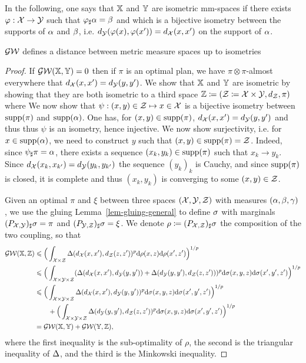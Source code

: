 In the following, one says that $\mathbb{X}$ and $\mathbb{Y}$ are isometric mm-spaces if there exists $\varphi : \mathcal{X} \rightarrow \mathcal{Y}$ such that $\varphi_{\sharp}\alpha=\beta$ and which is a bijective isometry between the supports of $\alpha$ and $\beta$, i.e. $d_{\mathcal{Y}}(\varphi(x),\varphi(x'))=d_{\mathcal{X}}(x,x')$ on the support of $\alpha$.
 

\begin{thm}
	$\operatorname{\mathcal{GW}}$ defines a distance between metric measure spaces up to isometries
\end{thm}
\begin{proof}
	If $\operatorname{\mathcal{GW}}( \mathbb{X},\mathbb{Y} )=0$ then if $\pi$ is an optimal plan, we have $\pi \otimes \pi$-almost everywhere that $d_{\mathcal{X}}(x,x')=d_{\mathcal{Y}}(y,y')$.
	We show that $\mathbb{X}$ and $\mathbb{Y}$ are isometric by showing that they are both isometric to a third space $\mathbb{Z} \coloneqq (\mathcal{Z} \coloneqq \mathcal{X} \times \mathcal{Y},d_{\mathcal{Z}},\pi)$
	where 
	We now show that $\psi : (x,y) \in \mathcal{Z} \mapsto x \in \mathcal{X}$ is a bijective isometry between $\operatorname{supp}(\pi)$ and $\operatorname{supp}(\alpha)$.
	One has, for $(x,y) \in \operatorname{supp}(\pi)$, $d_{\mathcal{X}}(x,x')=d_{\mathcal{Y}}(y,y')$ and thus
	thus $\psi$ is an isometry, hence injective. We now show surjectivity, i.e. for $x \in \operatorname{supp}(\alpha)$, we need to construct $y$ such that $(x,y) \in \operatorname{supp}(\pi)=\mathcal{Z}$. Indeed, since $\psi_\sharp \pi = \alpha$, there exists a sequence $(x_k,y_k) \in \operatorname{supp}(\pi)$ such that $x_k \rightarrow y_k$.
	Since $d_{\mathcal{X}}(x_k,x_{k'})=d_{\mathcal{Y}}(y_k,y_{k'})$ the sequence $(y_k)_k$ is Cauchy, and since $\operatorname{supp}(\pi)$ is closed, it is complete and thus $(x_k,y_k)$ is converging to some $(x,y) \in \mathcal{Z}$. 
		
	Given an optimal $\pi$ and $\xi$ between three spaces $(\mathcal{X},\mathcal{Y},\mathcal{Z})$ with measures $(\alpha,\beta,\gamma)$, we use the gluing Lemma~\ref{lem-gluing-general} to define $\sigma$ with marginals $(P_{\mathcal{X},\mathcal{Y}})_\sharp \sigma = \pi$ and $(P_{\mathcal{Y},\mathcal{Z}})_\sharp \sigma = \xi$. 
	We denote $\rho \coloneqq (P_{\mathcal{X},\mathcal{Z}})_\sharp \sigma$ the composition of the two coupling, so that
	$$\begin{aligned}
		\operatorname{\mathcal{GW}}( \mathbb{X},\mathbb{Z} ) & \leqslant \Big( \int_{\mathcal{X} \times \mathcal{Z}} \Delta(d_{\mathcal{X}}(x,x'),d_{\mathcal{Z}}(z,z'))^p \mathrm{d}\rho(x,z)\mathrm{d}\rho(x',z') \Big)^{1/p}  
			\\
		 &\leqslant \Big( \int_{\mathcal{X} \times \mathcal{Y} \times \mathcal{Z}} ( \Delta(d_{\mathcal{X}}(x,x'),d_{\mathcal{Y}}(y,y')) + \Delta(d_{\mathcal{Y}}(y,y'),d_{\mathcal{Z}}(z,z')) )^p \mathrm{d}\sigma(x,y,z) \mathrm{d}\sigma(x',y',z')\Big)^{1/p} \\
		 &\leqslant \Big( \int_{\mathcal{X} \times \mathcal{Y} \times \mathcal{Z}} \Delta(d_{\mathcal{X}}(x,x'),d_{\mathcal{Y}}(y,y'))^p \mathrm{d}\sigma(x,y,z) \mathrm{d}\sigma(x',y',z')\Big)^{1/p} \\
		 &\qquad + 
		 \Big( \int_{\mathcal{X} \times \mathcal{Y} \times \mathcal{Z}} \Delta(d_{\mathcal{Y}}(y,y'),d_{\mathcal{Z}}(z,z'))^p \mathrm{d}\sigma(x,y,z) \mathrm{d}\sigma(x',y',z')\Big)^{1/p}
		  \\
		  &= \operatorname{\mathcal{GW}}( \mathbb{X},\mathbb{Y} ) + \operatorname{\mathcal{GW}}( \mathbb{Y},\mathbb{Z} ), 
	\end{aligned}$$
	where the first inequality is the sub-optimality of $\rho$, the second is the triangular inequality of $\Delta$, 
	and the third is the Minkowski inequality.
\end{proof}


